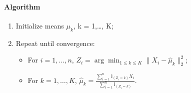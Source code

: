 \documentclass[12pt]{book}
\theoremstyle{definition}
\theoremstyle{remark}
\begin{document}
\paragraph{Algorithm}
\begin{enumerate}
    \item Initialize means $\mu_k$, k = 1,\dots, K;
    \item Repeat until convergence:
    \begin{itemize}
        \item For $i = 1,\dots, n$, $Z_i = \arg\min_{1\le k \le K}\|X_i - \hat{\mu}_k\|_2^2$;
        \item For $k = 1,\dots, K$, $\hat{\mu}_k = \frac{\sum_{i=1}^n \mathbb{I}_{(Z_i = k)} X_i}{\sum_{i=1}^n\mathbb{I}_{(Z_i = k)}}$.
    \end{itemize}
\end{enumerate}
\end{document}
